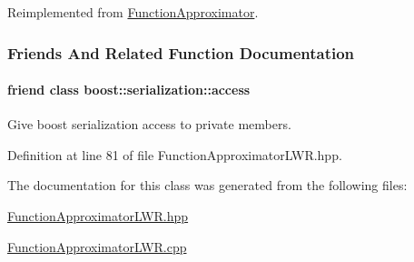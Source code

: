 Reimplemented from \hyperlink{classDmpBbo_1_1FunctionApproximator_a53d95f63de3b49491b1204f45a24ae25}{Function\+Approximator}.



\subsubsection{Friends And Related Function Documentation}
\hypertarget{classDmpBbo_1_1FunctionApproximatorLWR_ac98d07dd8f7b70e16ccb9a01abf56b9c}{
\paragraph[{boost\+::serialization\+::access}]{\setlength{\rightskip}{0pt plus 5cm}friend class boost\+::serialization\+::access\hspace{0.3cm}{\ttfamily [friend]}}}\label{classDmpBbo_1_1FunctionApproximatorLWR_ac98d07dd8f7b70e16ccb9a01abf56b9c}


Give boost serialization access to private members. 



Definition at line 81 of file Function\+Approximator\+L\+W\+R.\+hpp.



The documentation for this class was generated from the following files\+:\begin{DoxyCompactItemize}
\item 
\hyperlink{FunctionApproximatorLWR_8hpp}{Function\+Approximator\+L\+W\+R.\+hpp}\item 
\hyperlink{FunctionApproximatorLWR_8cpp}{Function\+Approximator\+L\+W\+R.\+cpp}\end{DoxyCompactItemize}
